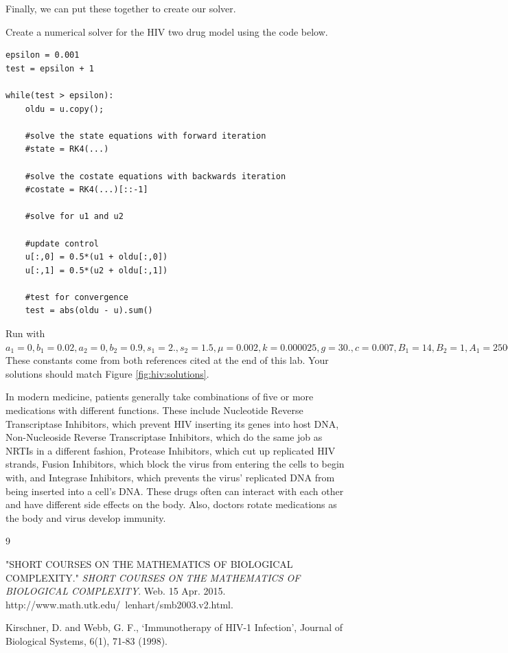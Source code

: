 Finally, we can put these together to create our solver.
\begin{problem}
Create a numerical solver for the HIV two drug model using the code below.

\begin{lstlisting}
epsilon = 0.001
test = epsilon + 1

while(test > epsilon):
	oldu = u.copy();
    
	#solve the state equations with forward iteration
	#state = RK4(...)
    
	#solve the costate equations with backwards iteration
	#costate = RK4(...)[::-1]
	
	#solve for u1 and u2
    
	#update control
	u[:,0] = 0.5*(u1 + oldu[:,0])
	u[:,1] = 0.5*(u2 + oldu[:,1])

	#test for convergence
	test = abs(oldu - u).sum()
\end{lstlisting}

Run with 
$a_1 = 0,
b_1 = 0.02,
a_2 = 0,
b_2 = 0.9, 
s_1 = 2.,
s_2 = 1.5, 
\mu = 0.002, 
k = 0.000025,
g = 30.,
c = 0.007,
B_1 = 14,
B_2 = 1,
A_1 = 250000,
A_2 = 75,
T_0 = 400,
V_0 = 3,
t_f = 50, \text{ and }
n = 1000.$ These constants come from both references cited at the end of this lab. Your solutions should match Figure \ref{fig:hiv:solutions}.
\label{problem:hiv:solver}

\label{problem:hiv:numericalsolver}
\end{problem}

In modern medicine, patients generally take combinations of five or more medications with different functions. These include Nucleotide Reverse Transcriptase Inhibitors, which prevent HIV inserting its genes into host DNA, Non-Nucleoside Reverse Transcriptase Inhibitors, which do the same job as NRTIs in a different fashion, Protease Inhibitors, which cut up replicated HIV strands, Fusion Inhibitors, which block the virus from entering the cells to begin with, and Integrase Inhibitors, which prevents the virus' replicated DNA from being inserted into a cell's DNA. These drugs often can interact with each other and have different side effects on the body. Also, doctors rotate medications as the body and virus develop immunity. 

\begin{thebibliography}{9}

"SHORT COURSES ON THE MATHEMATICS OF BIOLOGICAL COMPLEXITY." \textit{SHORT COURSES ON THE MATHEMATICS OF BIOLOGICAL COMPLEXITY}. Web. 15 Apr. 2015. http://www.math.utk.edu/~lenhart/smb2003.v2.html.

Kirschner, D. and Webb, G. F., `Immunotherapy of HIV-1 Infection', Journal of Biological Systems, 6(1), 71-83 (1998).
\end{thebibliography}

